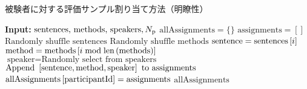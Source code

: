 \begin{algorithm}
    \caption{被験者に対する評価サンプル割り当て方法（明瞭性）}
    \label{sec4:algo:sample-assignment-int}
    \begin{algorithmic}[1]
        \State \textbf{Input:} $\text{sentences, methods, speakers}, N_{\text{p}}$
        \State $\text{allAssignments} = \{\}$
        \State $\text{assignments} = []$
        \State $\text{Randomly shuffle sentences}$
        \State $\text{Randomly shuffle methods}$
        \State $\text{sentence} = \text{sentences}\left[i\right]$
        \State $\text{method} = \text{methods}\left[i \bmod \text{len}\left(\text{methods}\right)\right]$
        \State $\text{speaker} = \text{Randomly select from speakers}$
        \State $\text{Append } \left[\text{sentence}, \text{method}, \text{speaker}\right] \text{ to assignments}$
        \EndFor
        \State $\text{allAssignments}\left[\text{participantId}\right] = \text{assignments}$
        \EndFor
        \State \Return $\text{allAssignments}$
    \end{algorithmic}
\end{algorithm}

